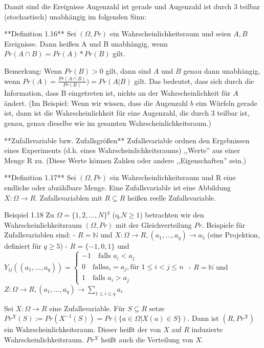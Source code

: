 \documentclass[a4paper]{article}
\begin{document}
\begin{multicols}{3}
    Damit sind die Ereignisse {Augenzahl ist gerade} und {Augenzahl ist durch 3 teilbar} (stochastisch) unabhängig im folgenden Sinn:

    **Definition 1.16** Sei $(\Omega,Pr)$ ein Wahrscheinlichkeitsraum und seien $A,B$ Ereignisse. Dann heißen A und B unabhängig, wenn $Pr(A\cap B)=Pr(A)*Pr(B)$ gilt.

    Bemerkung: Wenn $Pr(B)> 0$ gilt, dann sind $A$ und $B$ genau dann unabhängig, wenn $Pr(A) = \frac{Pr(A\cap B)}{Pr(B)})= Pr(A|B)$ gilt. Das bedeutet, dass sich durch die Information, dass B eingetreten ist, nichts an der Wahrscheinlichkeit für $A$ ändert. (Im Beispiel: Wenn wir wissen, dass die Augenzahl $b$  eim Würfeln gerade ist, dann ist die Wahrscheinlichkeit für eine Augenzahl, die durch 3 teilbar ist, genau, genau dieselbe wie im gesamten Wahrscheinlichkeitsraum.)

    **Zufallsvariable bzw. Zufallsgrößen** Zufallsvariable ordnen den Ergebnissen eines Experiments (d.h. eines Wahrscheinlichkeitsraums) ,,Werte''  aus einer Menge R zu. (Diese Werte können Zahlen oder andere ,,Eigenschaften'' sein.)

    **Definition 1.17** Sei $(\Omega,Pr)$ ein Wahrscheinlichkeitsraum und R eine endliche oder abzählbare Menge. Eine Zufallsvariable ist eine Abbildung $X:\Omega\rightarrow R$.
    Zufallsvariablen mit $R\subseteq R$ heißen reelle Zufallsvariable.

    Beispiel 1.18 Zu $\Omega=\{1,2,...,N\}^q$ (q,$N\geq 1$) betrachten wir den Wahrscheinlichkeitsraum $(\Omega,Pr)$ mit der Gleichverteilung $Pr$. Beispiele für Zufallsvariablen sind:
    - $R=\mathbb{N}$ und $X:\Omega\rightarrow R,(a_1,...,a_q)\rightarrow a_5$ (eine Projektion, definiert für $q\geq 5$)
    - $R=\{-1,0,1\}$ und $Y_{ij}((a_1,...,a_q))=\begin{cases} -1\quad\text{falls } a_i< a_j\\ 0\quad\text{falls} a_i=a_j, \text{für } 1\leq i < j\leq n \\ 1\quad\text{falls } a_i> a_j\end{cases}$
    - $R=\mathbb{N}$ und $Z:\Omega\rightarrow R,(a_1 ,...,a_q)\rightarrow\sum_{1\leq i\leq q} a_i$

    Sei $X:\Omega\rightarrow R$ eine Zufallsvariable. Für $S\subseteq R$ setze $Pr^X(S):= Pr(X^{-1}(S))=Pr(\{a\in\Omega|X(a)\in S\})$. Dann ist $(R,Pr^X)$ ein Wahrscheinlichkeitsraum. Dieser heißt der von $X$ auf $R$ induzierte Wahrscheinlichkeitsraum. $Pr^X$ heißt auch die Verteilung von $X$.


\end{multicols}
\end{document}
